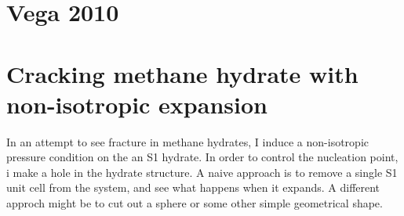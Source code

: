\section{Vega 2010}
\section{Cracking methane hydrate with non-isotropic expansion}
In an attempt to see fracture in methane hydrates, I induce a non-isotropic pressure condition on the an S1 hydrate. In order to control the nucleation point, i make a hole in the hydrate structure. A naive approach is to remove a single S1 unit cell from the system, and see what happens when it expands. A different approch might be to cut out a sphere or some other simple geometrical shape. 


